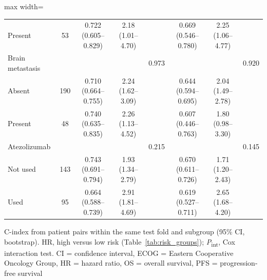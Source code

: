 \documentclass{article}
\begin{document}
\begin{table}[htbp]
\begin{adjustbox}{max width=\textwidth}
\begin{tabular}{@{}lc ccc ccc@{}}
\quad Present & 53 & 0.722 (0.605--0.829) & 2.18 (1.01--4.70) & & 0.669 (0.546--0.780) & 2.25 (1.06--4.77) & \\
Brain metastasis & & & & 0.973 & & & 0.920 \\
\quad Absent & 190 & 0.710 (0.664--0.755) & 2.24 (1.62--3.09) & & 0.644 (0.594--0.695) & 2.04 (1.49--2.78) & \\
\quad Present & 48 & 0.740 (0.635--0.835) & 2.26 (1.13--4.52) & & 0.607 (0.446--0.763) & 1.80 (0.98--3.30) & \\
Atezolizumab & & & & 0.215 & & & 0.145 \\
\quad Not used & 143 & 0.743 (0.691--0.794) & 1.93 (1.34--2.79) & & 0.670 (0.611--0.726) & 1.71 (1.20--2.43) & \\
\quad Used & 95 & 0.664 (0.588--0.739) & 2.91 (1.81--4.69) & & 0.619 (0.527--0.711) & 2.65 (1.68--4.20) & \\
\bottomrule
\end{tabular}%
\end{adjustbox}
\par\smallskip
\begin{minipage}{\textwidth}\footnotesize
C-index from patient pairs within the same test fold and subgroup (95\% CI, bootstrap). HR, high versus low risk (Table~\ref{tab:risk_groups}); \textit{P}\textsubscript{int}, Cox interaction test. CI = confidence interval, ECOG = Eastern Cooperative Oncology Group, HR = hazard ratio, OS = overall survival, PFS = progression-free survival
\end{minipage}
\end{table}
\end{document}
